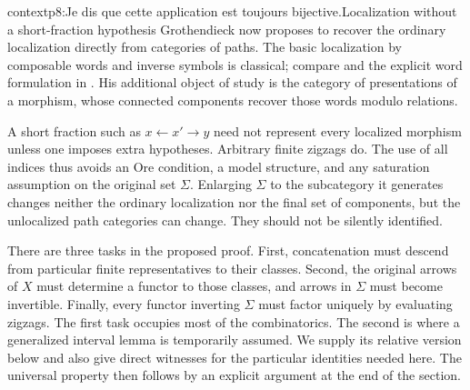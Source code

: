 \begin{dcomment}{context}{p8:Je dis que cette application est toujours bijective.}{Localization without a short-fraction hypothesis}
Grothendieck now proposes to recover the ordinary localization directly from categories of paths. The basic localization by composable words and inverse symbols is classical; compare \citet[Chapter~I, pp.~6--21]{GabrielZisman1967} and the explicit word formulation in \citet[\S3.1--3.3]{DwyerKan1980Simplicial}. His additional object of study is the category of presentations of a morphism, whose connected components recover those words modulo relations.

A short fraction such as $x\leftarrow x'\to y$ need not represent every localized morphism unless one imposes extra hypotheses. Arbitrary finite zigzags do. The use of all indices thus avoids an Ore condition, a model structure, and any saturation assumption on the original set $\Sigma$. Enlarging $\Sigma$ to the subcategory it generates changes neither the ordinary localization nor the final set of components, but the unlocalized path categories can change. They should not be silently identified.

There are three tasks in the proposed proof. First, concatenation must descend from particular finite representatives to their classes. Second, the original arrows of $X$ must determine a functor to those classes, and arrows in $\Sigma$ must become invertible. Finally, every functor inverting $\Sigma$ must factor uniquely by evaluating zigzags. The first task occupies most of the combinatorics. The second is where a generalized interval lemma is temporarily assumed. We supply its relative version below and also give direct witnesses for the particular identities needed here. The universal property then follows by an explicit argument at the end of the section.
\end{dcomment}

